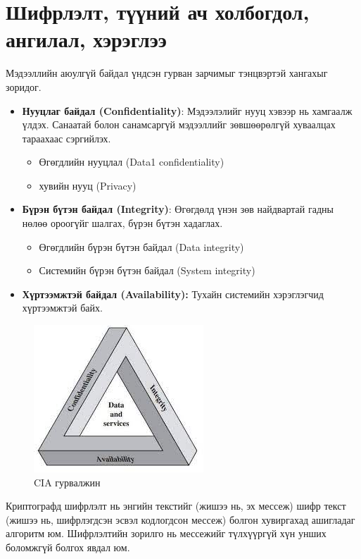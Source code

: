 \section{Шифрлэлт, түүний ач холбогдол, ангилал, хэрэглээ}
Мэдээллийн аюулгүй байдал үндсэн гурван зарчимыг тэнцвэртэй хангахыг зоридог. 
\begin{itemize}
    \item \textbf{Нууцлаг байдал (Confidentiality)}: Мэдээлэлийг нууц хэвээр нь хамгаалж үлдэх. Санаатай болон санамсаргүй мэдээллийг зөвшөөрөлгүй хуваалцах тараахаас сэргийлэх.
    \begin{itemize}
        \item Өгөгдлийн нууцлал (Data1 confidentiality)
        \item хувийн нууц (Privacy)
    \end{itemize}
    \item \textbf{Бүрэн бүтэн байдал (Integrity)}: Өгөгдөлд үнэн зөв найдвартай гадны нөлөө ороогүйг шалгах, бүрэн бүтэн хадаглах. 
    \begin{itemize}
        \item Өгөгдлийн бүрэн бүтэн байдал (Data integrity)
        \item Системийн бүрэн бүтэн байдал (System integrity) 
    \end{itemize}
    \item \textbf{Хүртээмжтэй байдал (Availability):} Тухайн системийн хэрэглэгчид хүртээмжтэй байх.
\end{itemize}

\begin{figure}[ht]
\centering
\includegraphics[scale=0.7]{Figures/cia_traid}
\caption[CIA гурвалжин]{CIA гурвалжин}
\label{fig:CIA}
\end{figure}

Криптографд шифрлэлт нь энгийн текстийг (жишээ нь, эх мессеж) шифр текст (жишээ нь, шифрлэгдсэн эсвэл кодлогдсон мессеж) болгон хувиргахад ашигладаг алгоритм юм. Шифрлэлтийн зорилго нь мессежийг түлхүүргүй хүн унших боломжгүй болгох явдал юм.

